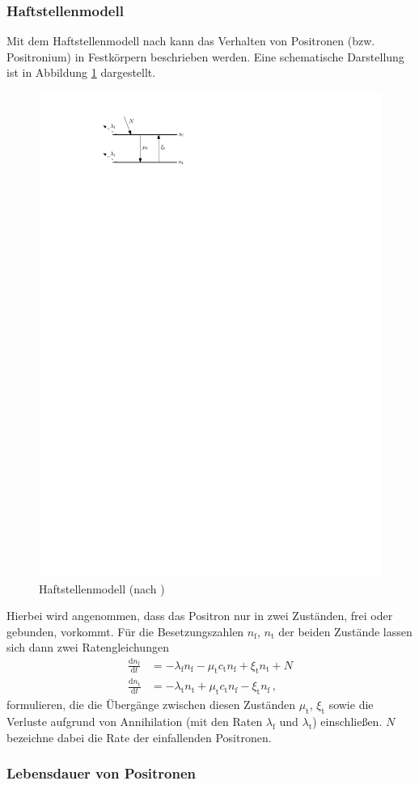 \documentclass[11pt, a4paper]{article}
\numberwithin{equation}{section}
\begin{document}
\subsubsection{Haftstellenmodell}

Mit dem Haftstellenmodell nach \cite{schatz} kann das Verhalten von Positronen (bzw. Positronium) in Festkörpern beschrieben werden.
Eine schematische Darstellung ist in Abbildung \ref{fig:trapping_model} dargestellt.
\begin{figure}[htbp]
	\centering
	\includegraphics[width=.5\textwidth]{./figures/trapping_model}
	\caption{Haftstellenmodell (nach \cite{schatz})}
	\label{fig:trapping_model}
\end{figure}
Hierbei wird angenommen, dass das Positron nur in zwei Zuständen, frei oder gebunden, vorkommt.
Für die Besetzungszahlen $n_\mathrm{f}$, $n_\mathrm{t}$ der beiden Zustände lassen sich dann zwei Ratengleichungen
\begin{align*}
	\frac{\mathrm{d}n_\mathrm{f}}{\mathrm{d}t}&=-\lambda_\mathrm{f}n_\mathrm{f}-\mu_\mathrm{t}c_\mathrm{t}n_\mathrm{f} + \xi_\mathrm{t}n_\mathrm{t} + N \\
	\frac{\mathrm{d}n_\mathrm{t}}{\mathrm{d}t}&=-\lambda_\mathrm{t}n_\mathrm{t}+\mu_\mathrm{t}c_\mathrm{t}n_\mathrm{f} - \xi_\mathrm{t}n_\mathrm{f} \, \text{,}
\end{align*}
formulieren, die die Übergänge zwischen diesen Zuständen $\mu_\mathrm{t}$, $\xi_\mathrm{t}$ sowie die Verluste aufgrund von Annihilation (mit den Raten $\lambda_\mathrm{f}$ und $\lambda_\mathrm{t}$) einschließen.
$N$ bezeichne dabei die Rate der einfallenden Positronen.
\subsubsection{Lebensdauer von Positronen}
\end{document}
